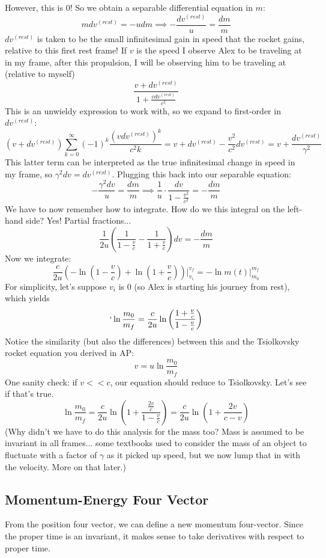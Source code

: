 However, this is $0$! So we obtain a separable differential equation in $m$: 
\[
    m dv^{(rest)} = - u dm \implies - \frac{dv^{(rest)}}{u} = \frac{dm}{m}
\]  
$dv^{(rest)}$ is taken to be the small infinitesimal gain in speed that the rocket gains, relative to this first rest frame! If $v$ is the speed I observe Alex to be traveling at in my frame, after this propulsion, I will be observing him to be traveling at (relative to myself)
\[
    \frac{v + dv^{(rest)}}{1 + \frac{vdv^{(rest)}}{c^2}}
\]
This is an unwieldy expression to work with, so we expand to first-order in $dv^{(rest)}$:
\[
    (v + dv^{(rest)}) \sum_{k=0}^\infty (-1)^k \frac{(vdv^{(rest)})^k}{c^2k} = v + dv^{(rest)} - \frac{v^2}{c^2} dv^{(rest)} = v + \frac{dv^{(rest)}}{\gamma^2}
\]
This latter term can be interpreted as the true infinitesimal change in speed in my frame, so $\gamma^2 dv = dv^{(rest)}$. Plugging this back into our separable equation: 
\[
    - \frac{\gamma^2 dv}{u} = \frac{dm}{m} \implies \frac{1}{u} \cdot \frac{dv}{1-\frac{v^2}{c^2}} = - \frac{dm}{m}
\]
We have to now remember how to integrate. How do we this integral on the left-hand side? Yes! Partial fractions...
\[
    \frac{1}{2u}\left(\frac{1}{1-\frac{v}{c}} - \frac{1}{1+\frac{v}{c}}\right)dv = - \frac{dm}{m}
\]
Now we integrate: 
\[
\frac{c}{2u} \left(-\ln\left(1-\frac{v}{c}\right) + \ln \left(1+\frac{v}{c} \right) \right)\Big|_{v_i}^{v_f} = - \ln m(t) \Big|_{m_0}^{m_f}
\]
For simplicity, let's suppose $v_i$ is 0 (so Alex is starting his journey from rest), which yields
\[
`   \ln \frac{m_0}{m_f} = \frac{c}{2u} \ln \left(\frac{1+\frac{v}{c}}{1-
\frac{v}{c}} \right)
\]
Notice the similarity (but also the differences) between this and the Tsiolkovsky rocket equation you derived in AP:
\[
    v = u \ln \frac{m_0}{m_f}
\]
One sanity check: if $v << c$, our equation should reduce to Tsiolkovsky. Let's see if that's true. 
\[
\ln \frac{m_0}{m_f} = \frac{c}{2u} \ln \left(1 + \frac{\frac{2v}{c}}{1 - \frac{v}{c}} \right) = \frac{c}{2u} \ln \left(1 + \frac{2v}{c - v} \right) 
\]
 (Why didn't we have to do this analysis for the mass too? Mass is assumed to be invariant in all frames... some textbooks used to consider the mass of an object to fluctuate with a factor of $\gamma$ as it picked up speed, but we now lump that in with the velocity. More on that later.)
\subsection{Momentum-Energy Four Vector}
From the position four vector, we can define a new momentum four-vector. Since the proper time is an invariant, it makes sense to take derivatives with respect to proper time. 

